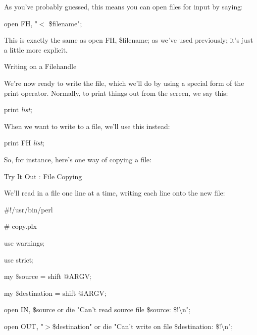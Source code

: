 \documentclass[a4paper,11pt]{book}
\begin{document}
\noindent As you've probably guessed, this means you can open files for input by saying:

\noindent 

\noindent open FH, "$<$ \$filename";

\noindent 

\noindent This is exactly the same as open FH, \$filename; as we've used previously; it's just a little more explicit.

\noindent 

\noindent Writing on a Filehandle

\noindent 

\noindent We're now ready to write the file, which we'll do by using a special form of the print operator. Normally, to print things out from the screen, we say this:

\noindent 

\noindent print \textit{list};

\noindent 

\noindent When we want to write to a file, we'll use this instead:

\noindent 

\noindent print FH \textit{list};

\noindent 

\noindent So, for instance, here's one way of copying a file:

\noindent 

\noindent Try It Out : File Copying

\noindent 

\noindent We'll read in a file one line at a time, writing each line onto the new file:

\noindent 

\noindent \#!/usr/bin/perl

\noindent \# copy.plx

\noindent use warnings;

\noindent use strict;

\noindent 

\noindent my \$source = shift @ARGV;

\noindent my \$destination = shift @ARGV;

\noindent 

\noindent 

\noindent open IN, \$source or die "Can't read source file \$source: \$!\textbackslash n";

\noindent open OUT, "$>$\$destination" or die "Can't write on file \$destination: \$!\textbackslash n";
\end{document}
